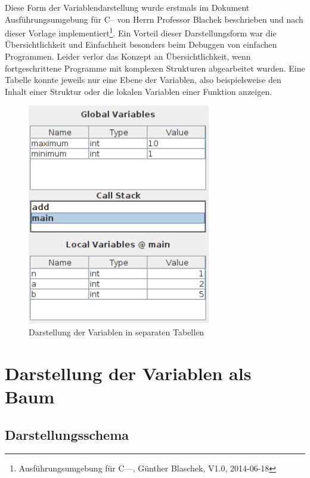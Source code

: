 Diese Form der Variablendarstellung wurde erstmals im Dokument Ausführungsumgebung für C-- von Herrn Professor Blachek beschrieben und nach dieser Vorlage implementiert\footnote{Ausführungsumgebung für C––, Günther Blaschek, V1.0, 2014-06-18}. Ein Vorteil dieser Darstellungsform war die Übersichtlichkeit und Einfachheit besonders beim Debuggen von einfachen Programmen. Leider verlor das Konzept an Übersichtlichkeit, wenn fortgeschrittene Programme mit komplexen Strukturen abgearbeitet wurden. Eine Tabelle konnte jeweils nur eine Ebene der Variablen, also beispielsweise den Inhalt einer Struktur oder die lokalen Variablen einer Funktion anzeigen.
\begin{figure}
\includegraphics[width=8cm]{./media/images/gui/var/callstack.png}
\caption{Darstellung der Variablen in separaten Tabellen}
\label{var_sep}
\end{figure}

\section{Darstellung der Variablen als Baum}

\subsection{Darstellungsschema}

